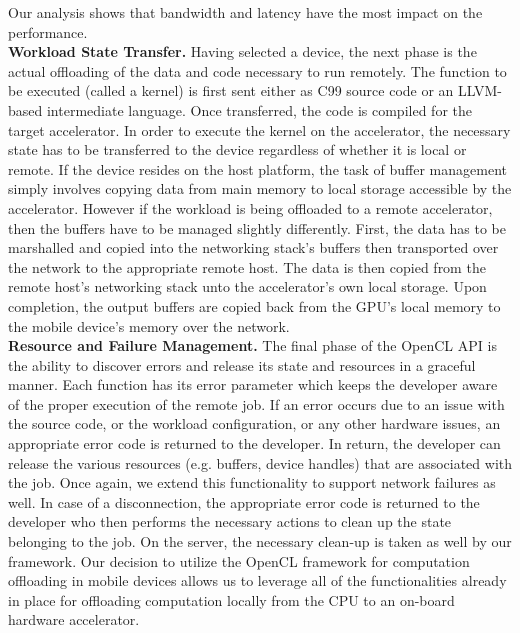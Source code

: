 \documentclass[10pt, conference, compsocconf]{IEEEtran}
\begin{document}
%
Our analysis shows that bandwidth and latency have the most impact on the 
performance.\\
%
\indent\textbf{Workload State Transfer.}
Having selected a device, the next phase is the actual offloading of the data
and code necessary to run remotely.
%
The function to be executed (called a kernel) is first sent either as C99 
source code or an LLVM-based intermediate language.
%
Once transferred, the code is compiled for the target accelerator.
%
In order to execute the kernel on the accelerator, the necessary state 
has to be transferred to the device regardless of whether it is local or 
remote.
%
If the device resides on the host platform, the task of buffer management 
simply involves copying data from main memory to local storage accessible 
by the accelerator.
%
However if the workload is being offloaded to a remote accelerator, then 
the buffers have to be managed slightly differently.
%
First, the data has to be marshalled and copied into the networking stack’s
buffers then transported over the network to the appropriate remote host.
%
The data is then copied from the remote host’s networking stack unto the 
accelerator’s own local storage.
%
Upon completion, the output buffers are copied back from the GPU’s local 
memory to the mobile device’s memory over the network.\\
%
\indent\textbf{Resource and Failure Management.}
The final phase of the OpenCL API is the ability to discover errors and 
release its state and resources in a graceful manner.
%
Each function has its error parameter which keeps the developer aware of 
the proper execution of the remote job.
%
If an error occurs due to an issue with the source code, or the workload 
configuration, or any other hardware issues, an appropriate error code is 
returned to the developer.
%
In return, the developer can release the various resources (e.g. buffers, 
device handles) that are associated with the job.
%
Once again, we extend this functionality to support network failures as well.
%
In case of a disconnection, the appropriate error code is returned to the 
developer who then performs the necessary actions to clean up the state 
belonging to the job.
%
On the server, the necessary clean-up is taken as well by our framework.
%
Our decision to utilize the OpenCL framework for computation offloading in 
mobile devices allows us to leverage all of the functionalities already in 
place for offloading computation locally from the CPU to an on-board hardware 
accelerator.
%
\end{document}
